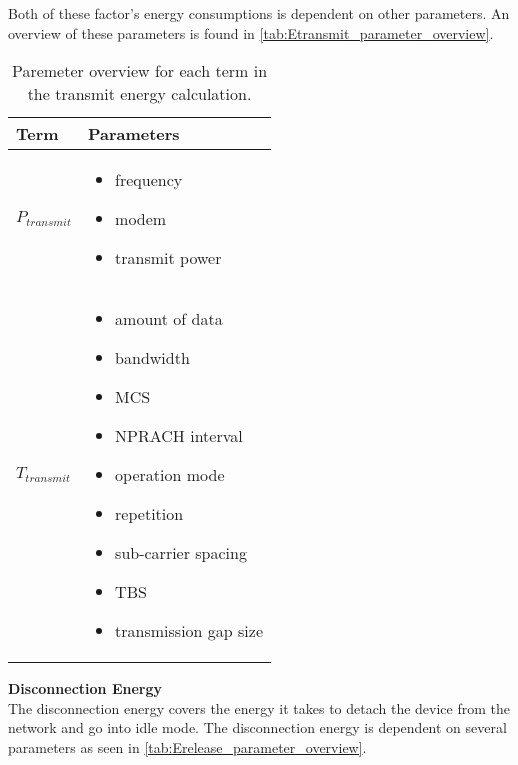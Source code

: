 Both of these factor's energy consumptions is dependent on other parameters. An overview of these parameters is found in \autoref{tab:Etransmit_parameter_overview}.

\begin{table}[H]
\centering
\begin{tabular}{|m{3cm}|m{6cm}|} \hline
\textbf{Term} & \textbf{Parameters} \\ \hline
$P_{transmit}$ & \begin{itemize}
\item frequency
\item modem
\item transmit power 
\end{itemize} \\ \hline
$T_{transmit}$ & \begin{itemize}
\item amount of data
\item bandwidth
\item \gls{MCS}
\item NPRACH interval
\item operation mode
\item repetition
\item sub-carrier spacing
\item \gls{TBS}
\item transmission gap size
\end{itemize} \\ \hline
\end{tabular}
\caption{Paremeter overview for each term in the transmit energy calculation.}
\label{tab:Etransmit_parameter_overview}
\end{table}


\textbf{Disconnection Energy}\\
The disconnection energy covers the energy it takes to detach the device from the network and go into idle mode. The disconnection energy is dependent on several parameters as seen in \autoref{tab:Erelease_parameter_overview}.

